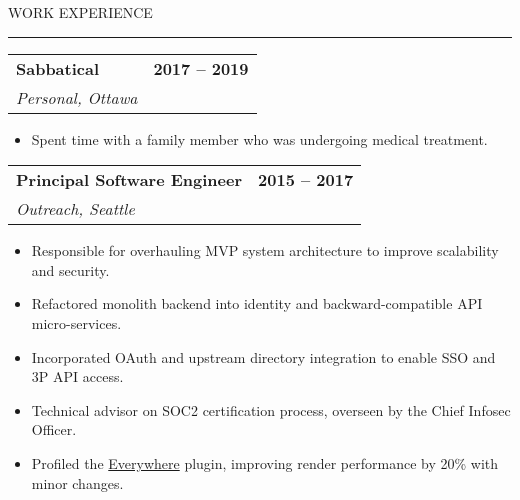 \documentclass[12pt]{article}
\makeatletter
\newenvironment{justifycolumns}
{\begin{tabular*}{\textwidth}{@{\extracolsep{\fill}}lr@{}}}
{\end{tabular*}}
\newcommand{\row}[2]{#1 & #2 \\}
\newcommand{\rowheading}[2]{\row{\textbf{#1}}{\textbf{#2}}}
\newcommand{\range}[2]{#1 -- #2}
\newcommand{\blockseparation}{\vspace{0.15in}}
\newcommand{\heading}[1]{
	\blockseparation
	\uppercase{#1}
	\vspace{0.05in}
	\hrule
	\blockseparation
}
\newenvironment{tightbullets}
{\begin{itemize}}
{\end{itemize}}
\newenvironment{bullets}
{\begin{tightbullets}}
{\end{tightbullets} \blockseparation}
\makeatother
\begin{document}
\begin{flushleft}
\heading{Work Experience}

\begin{justifycolumns}
	\rowheading{Sabbatical}{\range{2017}{2019}}
	\row{\emph{Personal, Ottawa}}{}
\end{justifycolumns}
\begin{bullets}
	\item Spent time with a family member who was undergoing medical treatment.
\end{bullets}

\begin{justifycolumns}
	\rowheading{Principal Software Engineer}{\range{2015}{2017}}
	\row{\emph{Outreach, Seattle}}{}
\end{justifycolumns}
\begin{bullets}
	\item Responsible for overhauling MVP system architecture to improve scalability and security.
	\item Refactored monolith backend into identity and backward-compatible API micro-services.
	\item Incorporated OAuth and upstream directory integration to enable SSO and 3P API access.
	\item Technical advisor on SOC2 certification process, overseen by the Chief Infosec Officer.
	\item Profiled the \href{https://chrome.google.com/webstore/detail/outreach-everywhere/chmpifjjfpeodjljjadlobceoiflhdid}{Everywhere} plugin, improving render performance by 20\% with minor changes.
\end{bullets}


\end{flushleft}
\end{document}
